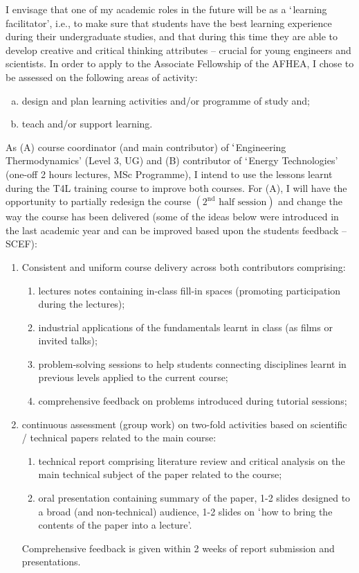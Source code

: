 \documentclass[14pt,twoside]{article}
\begin{document}
I envisage that one of my academic roles in the future will be as a $\lq$learning facilitator', i.e., to make sure that students have the best learning experience during their undergraduate studies, and that during this time they are able to develop creative and critical thinking attributes -- crucial for young engineers and scientists. In order to apply to the Associate Fellowship of the AFHEA, I chose to be assessed on the following areas of activity: 
\begin{enumerate}[(a)]
\item\label{Act1} design and plan learning activities and/or programme of study and;
\item\label{Act2} teach and/or support learning.
\end{enumerate}
As (A) course coordinator (and main contributor) of $\lq$Engineering Thermodynamics' (Level 3, UG) and (B) contributor of $\lq$Energy Technologies' (one-off 2 hours lectures, MSc Programme), I intend to use the lessons learnt during the T4L training course to improve both courses. For (A), I will have the opportunity to partially redesign the course $\left(\text{2}^{\text{nd}}\text{ half session}\right)$ and change the way the course has been delivered (some of the ideas below were introduced in the last academic year and can be improved based upon the students feedback -- SCEF):
\begin{enumerate}
%
\item\label{CourseMaterial} Consistent and uniform course delivery across both contributors comprising: 
\begin{enumerate}
\item lectures notes containing in-class fill-in spaces (promoting participation during the lectures); 
\item industrial applications of the fundamentals learnt in class (as films or invited talks);
\item problem-solving sessions to help students connecting disciplines learnt in previous levels applied to the current course;
\item comprehensive feedback on problems introduced during tutorial sessions;
\end{enumerate}
\item continuous assessment (group work) on two-fold activities based on scientific / technical papers related to the main course: 
\begin{enumerate}
\item technical report comprising literature review and critical analysis on the main technical subject of the paper related to the course;
\item oral presentation containing summary of the paper, 1-2 slides designed to a broad (and non-technical) audience, 1-2 slides on $\lq$how to bring the contents of the paper into a lecture'.  
\end{enumerate}
Comprehensive feedback is given within 2 weeks of report submission and presentations.  
%
\end{enumerate} 
\end{document}
